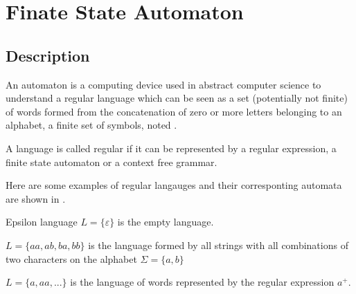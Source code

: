\section{Finate State Automaton}

\subsection{Description}
An automaton \automaton{} is a computing device used in abstract computer science to understand a regular language \lang{} which can be seen as a set (potentially not finite) of words \word{} formed from the concatenation of zero or more letters  belonging to an alphabet, a finite set of symbols, noted \alphabet{}.

\begin{theorem}
  A language is called regular if it can be represented by a regular expression, a finite state automaton or a context free grammar.
\end{theorem}

Here are some examples of regular langauges and their corresponting automata are shown in .
\begin{exmp}{Epsilon language}
  \label{exmp:lang_eps}
  $L = \{\varepsilon\}$ is the empty language.
\end{exmp}

\begin{exmp}
  \label{exmp:lang_ab_len2}
  $L = \{aa, ab, ba, bb\}$ is the language formed by all strings with all combinations of two characters on the alphabet $\Sigma = \{a, b\}$
\end{exmp}

\begin{exmp}
  \label{exmp:a_plus}
  $L = \{a, aa, ...\}$ is the language of words represented by the regular expression $a^+$.
\end{exmp}

